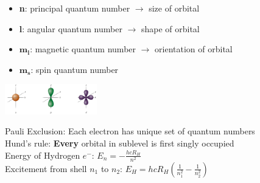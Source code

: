     \vspace*{0.3em}
    
    \begin{itemize}
        \itemsep0em
        \item \textbf{n}: principal quantum number $\rightarrow$ size of orbital
        \item \textbf{l}: angular quantum number $\rightarrow$ shape of orbital
        \item $\boldsymbol{m_l}$: magnetic quantum number $\rightarrow$ orientation of orbital
        \item $\boldsymbol{m_s}$: spin quantum number
    \end{itemize}
    \centerline{\includegraphics[width=40mm]{src/2_Atoms/images/orbital_shapes.png}}
    
    Pauli Exclusion: Each electron has unique set of quantum numbers\\
    Hund's rule: \textbf{Every} orbital in sublevel is first singly occupied\\
    Energy of Hydrogen $e^-$: $E_n = -\frac{hcR_H}{n^2}$\\
    Excitement from shell $n_1$ to $n_2$: $E_H = hcR_H (\frac{1}{n_1^2} - \frac{1}{n_2^2})$